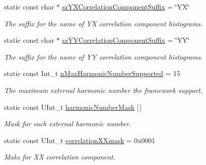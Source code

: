 \begin{DoxyCompactItemize}
static const char $\ast$ \mbox{\hyperlink{classQn_1_1CorrectionHistogramBase_a4305472e64e86683e259dc5a99256b0b}{sz\+Y\+X\+Correlation\+Component\+Suffix}} = \char`\"{}YX\char`\"{}
\begin{DoxyCompactList}\small\item\em The suffix for the name of YX correlation component histograms. \end{DoxyCompactList}\item 
\mbox{\label{classQn_1_1CorrectionHistogramBase_ad2f59c83cee8f613df28c340493107aa}} 
static const char $\ast$ \mbox{\hyperlink{classQn_1_1CorrectionHistogramBase_ad2f59c83cee8f613df28c340493107aa}{sz\+Y\+Y\+Correlation\+Component\+Suffix}} = \char`\"{}YY\char`\"{}
\begin{DoxyCompactList}\small\item\em The suffix for the name of YY correlation component histograms. \end{DoxyCompactList}\item 
\mbox{\label{classQn_1_1CorrectionHistogramBase_a731e490a1c62fc74e60bc175dbe59328}} 
static const Int\+\_\+t \mbox{\hyperlink{classQn_1_1CorrectionHistogramBase_a731e490a1c62fc74e60bc175dbe59328}{n\+Max\+Harmonic\+Number\+Supported}} = 15
\begin{DoxyCompactList}\small\item\em The maximum external harmonic number the framework support. \end{DoxyCompactList}\item 
static const U\+Int\+\_\+t \mbox{\hyperlink{classQn_1_1CorrectionHistogramBase_a5a719ffc64b87fe2b04190a69ac75919}{harmonic\+Number\+Mask}} \mbox{[}$\,$\mbox{]}
\begin{DoxyCompactList}\small\item\em Mask for each external harmonic number. \end{DoxyCompactList}\item 
\mbox{\label{classQn_1_1CorrectionHistogramBase_a3f65715d3cb0b61ef26c45750cc720e1}} 
static const U\+Int\+\_\+t \mbox{\hyperlink{classQn_1_1CorrectionHistogramBase_a3f65715d3cb0b61ef26c45750cc720e1}{correlation\+X\+Xmask}} = 0x0001
\begin{DoxyCompactList}\small\item\em Maks for XX correlation component. \end{DoxyCompactList}\item 

\end{DoxyCompactItemize}
